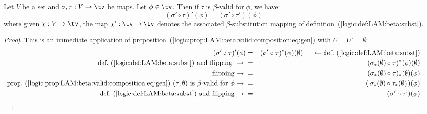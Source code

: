 \begin{prop}\label{logic:prop:LAM:beta:valid:composition:eq}
    Let $V$ be a set and $\sigma,\tau:V\to\tv$ be maps. Let $\phi\in\tv$. Then
    if $\tau$ is $\beta$-valid for $\phi$, we have:
        \[
            (\sigma'\circ\tau)' (\phi) = (\sigma'\circ\tau')(\phi)
        \]
    where given $\chi:V\to\tv$, the map $\chi':\tv\to\tv$ denotes the 
    associated $\beta$-substitution mapping of 
    definition~(\ref{logic:def:LAM:beta:subst}).
\end{prop}
\begin{proof}
    This is an immediate application of 
    proposition~(\ref{logic:prop:LAM:beta:valid:composition:eq:gen}) with
    $U=U'=\emptyset$:         
        \begin{eqnarray*}(\sigma'\circ\tau)'(\phi)
            &=&(\sigma'\circ\tau)^{*}(\phi)(\emptyset)
            \mbox{\ \ \ \ \ $\leftarrow$\ def.~(\ref{logic:def:LAM:beta:subst})}\\
            \mbox{def.~(\ref{logic:def:LAM:beta:subst}) and flipping
            \ $\to$\ }
            &=&(\sigma_{*}(\emptyset)\circ\tau)^{*}(\phi)(\emptyset)\\
            \mbox{flipping\ $\to$\ }
            &=&(\sigma_{*}(\emptyset)\circ\tau)_{*}(\emptyset)(\phi)\\
            \mbox{prop.~(\ref{logic:prop:LAM:beta:valid:composition:eq:gen})
            $(\tau,\emptyset)$ is $\beta$-valid for $\phi$\ $\to$\ }
            &=&(\,\sigma_{*}(\emptyset)\circ\tau_{*}(\emptyset)\,)(\phi)\\
            \mbox{def.~(\ref{logic:def:LAM:beta:subst}) and flipping\ $\to$\ }
            &=&(\sigma'\circ\tau')(\phi)
        \end{eqnarray*}
\end{proof}

